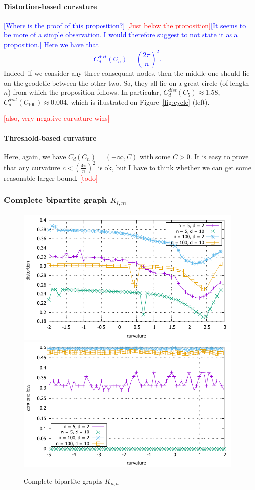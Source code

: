 \documentclass{article} %
\newtheorem{proposition}[theorem]{Proposition}
\newcommand{\ph}[1]{\textcolor{blue}{#1}}
\newcommand{\lt}[1]{\textcolor{red}{#1}}
\begin{document}
\paragraph{Distortion-based curvature} 

\ph{[Where is the proof of this proposition?]} \lt{[Just below the proposition]}\ph{[It seems to be more of a simple observation. I would therefore suggest to not state it as a proposition.]} 
\ph{Here we have that
\begin{equation}\label{eq:cycle_distortion}
	C_d^{dist}(C_n) = \left(\frac{2\pi}{n}\right)^2.
\end{equation}
}
Indeed, if we consider any three consequent nodes, then the middle one should lie on the geodetic between the other two. So, they all lie on a great circle (of length $n$) from which the proposition follows.
In particular, $C_d^{dist}(C_5) \approx 1.58$, $C_d^{dist}(C_{100}) \approx 0.004$, which is illustrated on Figure~\ref{fig:cycle} (left).

\textcolor{red}{[also, very negative curvature wins]}

\paragraph{Threshold-based curvature} 
Here, again, we have $C_d(C_n) = (-\infty, C)$ with some $C>0$. It is easy to prove that any curvature $c < \left(\frac{4\pi}{n}\right)^2$ is ok, but I have to think whether we can get some reasonable larger bound. \textcolor{red}{[todo]}


\subsubsection{Complete bipartite graph $K_{l,m}$}

\begin{figure}
    \centering
    \includegraphics[width = 0.49 \textwidth]{bipartite_distortion.pdf}
    \includegraphics[width = 0.49 \textwidth]{bipartite_zero_one.pdf}
    \caption{Complete bipartite graphs $K_{n,n}$}
    \label{fig:bipartite}
\end{figure}
\end{document}
